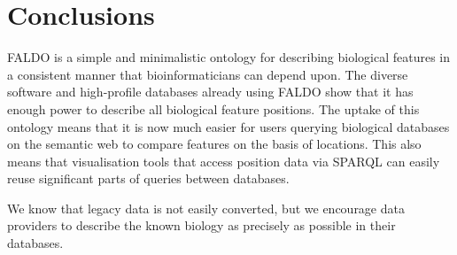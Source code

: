 \section*{Conclusions}
FALDO is a simple and minimalistic ontology for describing biological features in a consistent manner that bioinformaticians can depend upon.
The diverse software and high-profile databases already using FALDO show that it has enough power to describe all biological feature positions.
The uptake of this ontology means that it is now much easier for users querying biological databases on the semantic web to compare features on the basis of locations.
This also means that visualisation tools that access position data via SPARQL can easily reuse significant parts of queries between databases.

We know that legacy data is not easily converted, but we encourage data providers to describe the known biology as precisely as possible in their databases.
